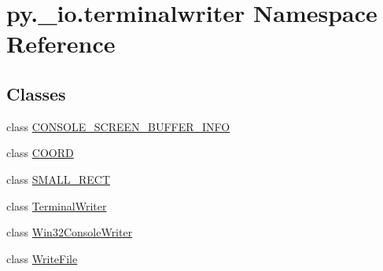 \hypertarget{namespacepy_1_1__io_1_1terminalwriter}{}\section{py.\+\_\+io.\+terminalwriter Namespace Reference}
\label{namespacepy_1_1__io_1_1terminalwriter}
\subsection*{Classes}
\begin{DoxyCompactItemize}
\item 
class \hyperlink{classpy_1_1__io_1_1terminalwriter_1_1_c_o_n_s_o_l_e___s_c_r_e_e_n___b_u_f_f_e_r___i_n_f_o}{C\+O\+N\+S\+O\+L\+E\+\_\+\+S\+C\+R\+E\+E\+N\+\_\+\+B\+U\+F\+F\+E\+R\+\_\+\+I\+N\+FO}
\item 
class \hyperlink{classpy_1_1__io_1_1terminalwriter_1_1_c_o_o_r_d}{C\+O\+O\+RD}
\item 
class \hyperlink{classpy_1_1__io_1_1terminalwriter_1_1_s_m_a_l_l___r_e_c_t}{S\+M\+A\+L\+L\+\_\+\+R\+E\+CT}
\item 
class \hyperlink{classpy_1_1__io_1_1terminalwriter_1_1_terminal_writer}{Terminal\+Writer}
\item 
class \hyperlink{classpy_1_1__io_1_1terminalwriter_1_1_win32_console_writer}{Win32\+Console\+Writer}
\item 
class \hyperlink{classpy_1_1__io_1_1terminalwriter_1_1_write_file}{Write\+File}
\end{DoxyCompactItemize}
